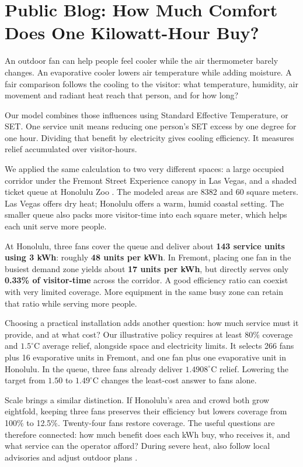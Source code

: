 \clearpage
\section*{Public Blog: How Much Comfort Does One Kilowatt-Hour Buy?}

An outdoor fan can help people feel cooler while the air thermometer barely changes. An evaporative cooler lowers air temperature while adding moisture. A fair comparison follows the cooling to the visitor: what temperature, humidity, air movement and radiant heat reach that person, and for how long?

Our model combines those influences using Standard Effective Temperature, or SET. One service unit means reducing one person's SET excess by one degree for one hour. Dividing that benefit by electricity gives cooling efficiency. It measures relief accumulated over visitor-hours.

We applied the same calculation to two very different spaces: a large occupied corridor under the Fremont Street Experience canopy in Las Vegas, and a shaded ticket queue at Honolulu Zoo \cite{fremont-canopy,honolulu-zoo-entrance}. The modeled areas are 8382 and 60 square meters. Las Vegas offers dry heat; Honolulu offers a warm, humid coastal setting. The smaller queue also packs more visitor-time into each square meter, which helps each unit serve more people.

At Honolulu, three fans cover the queue and deliver about \textbf{143 service units using 3 kWh}: roughly \textbf{48 units per kWh}. In Fremont, placing one fan in the busiest demand zone yields about \textbf{17 units per kWh}, but directly serves only \textbf{0.33\% of visitor-time} across the corridor. A good efficiency ratio can coexist with very limited coverage. More equipment in the same busy zone can retain that ratio while serving more people.

Choosing a practical installation adds another question: how much service must it provide, and at what cost? Our illustrative policy requires at least 80\% coverage and $1.5^\circ$C average relief, alongside space and electricity limits. It selects 266 fans plus 16 evaporative units in Fremont, and one fan plus one evaporative unit in Honolulu. In the queue, three fans already deliver $1.4908^\circ$C relief. Lowering the target from $1.50$ to $1.49^\circ$C changes the least-cost answer to fans alone.

Scale brings a similar distinction. If Honolulu's area and crowd both grow eightfold, keeping three fans preserves their efficiency but lowers coverage from 100\% to 12.5\%. Twenty-four fans restore coverage. The useful questions are therefore connected: how much benefit does each kWh buy, who receives it, and what service can the operator afford? During severe heat, also follow local advisories and adjust outdoor plans \cite{nws-heat}.
